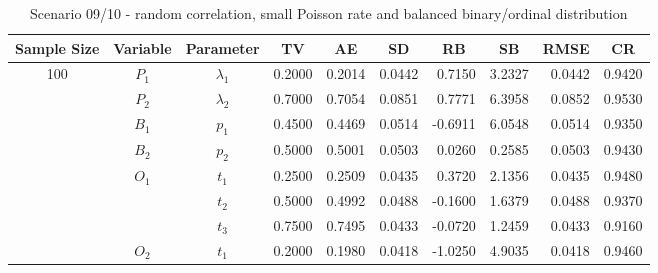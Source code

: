 \documentclass[letterpaper]{article}
\begin{document}
\begin{table}[h]
\centering
\caption{Scenario 09/10 - random correlation, small Poisson rate and balanced binary/ordinal distribution}
\begin{tabular}{cccrrrrrrr}
\hline
Sample Size & Variable    & Parameter      & \multicolumn{1}{c}{TV} & \multicolumn{1}{c}{AE} & \multicolumn{1}{c}{SD} & \multicolumn{1}{c}{RB} & \multicolumn{1}{c}{SB} & \multicolumn{1}{c}{RMSE} & \multicolumn{1}{c}{CR} \\\hline
100         & $P_1$       & $\lambda_1$    & 0.2000                 & 0.2014                 & 0.0442                 & 0.7150                 & 3.2327                 & 0.0442                   & 0.9420                 \\
            & $P_2$       & $\lambda_2$    & 0.7000                 & 0.7054                 & 0.0851                 & 0.7771                 & 6.3958                 & 0.0852                   & 0.9530                 \\
            & $B_1$       & $p_1$          & 0.4500                 & 0.4469                 & 0.0514                 & -0.6911                & 6.0548                 & 0.0514                   & 0.9350                 \\
            & $B_2$       & $p_2$          & 0.5000                 & 0.5001                 & 0.0503                 & 0.0260                 & 0.2585                 & 0.0503                   & 0.9430                 \\
            & $O_1$       & $t_1$          & 0.2500                 & 0.2509                 & 0.0435                 & 0.3720                 & 2.1356                 & 0.0435                   & 0.9480                 \\
            &             & $t_2$          & 0.5000                 & 0.4992                 & 0.0488                 & -0.1600                & 1.6379                 & 0.0488                   & 0.9370                 \\
            &             & $t_3$          & 0.7500                 & 0.7495                 & 0.0433                 & -0.0720                & 1.2459                 & 0.0433                   & 0.9160                 \\
            & $O_2$       & $t_1$          & 0.2000                 & 0.1980                 & 0.0418                 & -1.0250                & 4.9035                 & 0.0418                   & 0.9460                 \\

\end{tabular}
\end{table}
\end{document}
